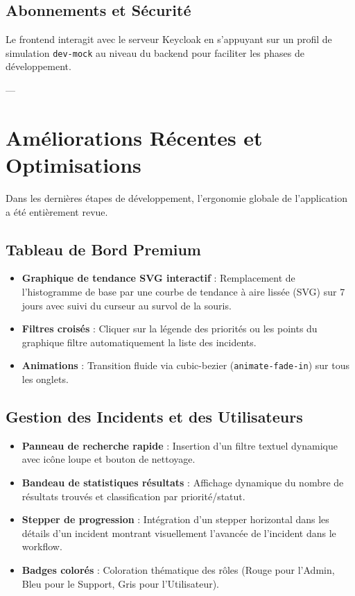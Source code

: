 \documentclass[12pt]{article}
\begin{document}
\subsection{Abonnements et Sécurité}
Le frontend interagit avec le serveur Keycloak en s'appuyant sur un profil de simulation \texttt{dev-mock} au niveau du backend pour faciliter les phases de développement.

---

\section{Améliorations Récentes et Optimisations}
Dans les dernières étapes de développement, l'ergonomie globale de l'application a été entièrement revue.

\subsection{Tableau de Bord Premium}
\begin{itemize}
    \item \textbf{Graphique de tendance SVG interactif} : Remplacement de l'histogramme de base par une courbe de tendance à aire lissée (SVG) sur 7 jours avec suivi du curseur au survol de la souris.
    \item \textbf{Filtres croisés} : Cliquer sur la légende des priorités ou les points du graphique filtre automatiquement la liste des incidents.
    \item \textbf{Animations} : Transition fluide via cubic-bezier (\texttt{animate-fade-in}) sur tous les onglets.
\end{itemize}

\subsection{Gestion des Incidents et des Utilisateurs}
\begin{itemize}
    \item \textbf{Panneau de recherche rapide} : Insertion d'un filtre textuel dynamique avec icône loupe et bouton de nettoyage.
    \item \textbf{Bandeau de statistiques résultats} : Affichage dynamique du nombre de résultats trouvés et classification par priorité/statut.
    \item \textbf{Stepper de progression} : Intégration d'un stepper horizontal dans les détails d'un incident montrant visuellement l'avancée de l'incident dans le workflow.
    \item \textbf{Badges colorés} : Coloration thématique des rôles (Rouge pour l'Admin, Bleu pour le Support, Gris pour l'Utilisateur).
\end{itemize}
\end{document}
